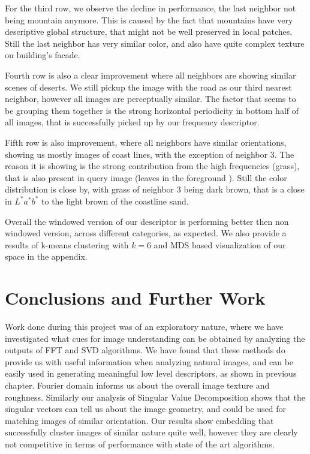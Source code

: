 \documentclass{report}
\begin{document}
For the third row, we observe the decline in performance, the last neighbor not being mountain anymore. This is caused by the fact that mountains have very descriptive global structure, that might not be well preserved in local patches. Still the last neighbor has very similar color, and also have quite complex texture on building's facade.

Fourth row is also a clear improvement where all neighbors are showing similar scenes of deserts. We still pickup the image with the road as our third nearest neighbor, however all images are perceptually similar. The factor that seems to be grouping them together is the strong horizontal periodicity in bottom half of all images, that is successfully picked up by our frequency descriptor. 

Fifth row is also improvement, where all neighbors have similar orientations, showing us mostly images of coast lines, with the exception of neighbor 3. The reason it is showing is the strong contribution from the high frequencies (grass), that is also present in query image (leaves in the foreground ). Still the color distribution is close by, with grass of neighbor 3 being dark brown, that is a close in $L^*a^*b^*$ to the light brown of the coastline sand.

Overall the windowed version of our descriptor is performing better then non windowed version, across different categories, as expected.
We also provide a results of k-means clustering with $k=6$ and MDS based visualization of our space in the appendix.

\chapter{Conclusions and Further Work}
\label{chap:Conclusions}
Work done during this project was of an exploratory nature, where we have investigated what cues for image understanding can be obtained by analyzing the outputs of FFT and SVD algorithms. We have found that these methods do provide us with useful information when analyzing natural images, and can be easily used in generating meaningful low level descriptors, as shown in previous chapter. Fourier domain informs us about the overall image texture and roughness. Similarly our analysis of Singular Value Decomposition shows that the singular vectors can tell us about the image geometry, and could be used for matching images of similar orientation. Our results show embedding that successfully cluster images of similar nature quite well, however they are clearly not competitive in terms of performance with state of the art algorithms.
\end{document}
